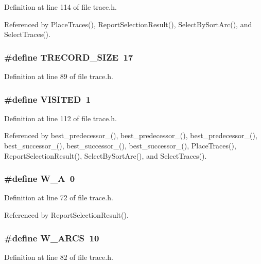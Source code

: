 Definition at line 114 of file trace.h.

Referenced by Place\-Traces(), Report\-Selection\-Result(), Select\-By\-Sort\-Arc(), and Select\-Traces().
\subsubsection{\setlength{\rightskip}{0pt plus 5cm}\#define TRECORD\_\-SIZE~17}\label{trace_8h_4282b62df732f0c618edd6586486d223}




Definition at line 89 of file trace.h.
\subsubsection{\setlength{\rightskip}{0pt plus 5cm}\#define VISITED~1}\label{trace_8h_28615ad40e5d11edaefd903c02206f6d}




Definition at line 112 of file trace.h.

Referenced by best\_\-predecessor\_(), best\_\-predecessor\_(), best\_\-predecessor\_(), best\_\-successor\_(), best\_\-successor\_(), best\_\-successor\_(), Place\-Traces(), Report\-Selection\-Result(), Select\-By\-Sort\-Arc(), and Select\-Traces().
\subsubsection{\setlength{\rightskip}{0pt plus 5cm}\#define W\_\-A~0}\label{trace_8h_9aafb61bf42c6db64460c4d5575ab5e3}




Definition at line 72 of file trace.h.

Referenced by Report\-Selection\-Result().
\subsubsection{\setlength{\rightskip}{0pt plus 5cm}\#define W\_\-ARCS~10}\label{trace_8h_f1d19ee9edb82b487fa2e60f2d941c67}




Definition at line 82 of file trace.h.

